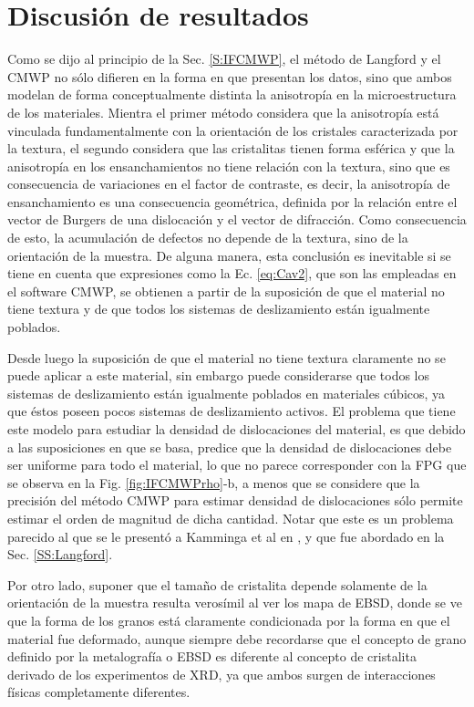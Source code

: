 \section{Discusión de resultados}\label{S:IFDis}
Como se dijo al principio de la Sec. \ref{S:IFCMWP}, el método de Langford y el CMWP no sólo difieren en la forma en que presentan los datos, sino que ambos modelan de forma conceptualmente distinta la anisotropía en la microestructura de los materiales.
Mientra el primer método considera que la anisotropía está vinculada fundamentalmente con la orientación de los cristales caracterizada por la textura, el segundo considera que las cristalitas tienen forma esférica y que la anisotropía en los ensanchamientos no tiene relación con la textura, sino que es consecuencia de variaciones en el factor de contraste, es decir, la anisotropía de ensanchamiento es una consecuencia geométrica, definida por la relación entre el vector de Burgers de una dislocación y el vector de difracción.
Como consecuencia de esto, la acumulación de defectos no depende de la textura, sino de la orientación de la muestra.
De alguna manera, esta conclusión es inevitable si se tiene en cuenta que expresiones como la Ec. \ref{eq:Cav2}, que son las empleadas en el software CMWP, se obtienen a partir de la suposición de que el material no tiene textura y de que todos los sistemas de deslizamiento están igualmente poblados.

Desde luego la suposición de que el material no tiene textura claramente no se puede aplicar a este material, sin embargo puede considerarse que todos los sistemas de deslizamiento están igualmente poblados en materiales cúbicos, ya que éstos poseen pocos sistemas de deslizamiento activos.
El problema que tiene este modelo para estudiar la densidad de dislocaciones del material, es que debido a las suposiciones en que se basa, predice que la densidad de dislocaciones debe ser uniforme para todo el material, lo que no parece corresponder con la FPG que se observa en la Fig. \ref{fig:IFCMWPrho}-b, a menos que se considere que la precisión del método CMWP para estimar densidad de dislocaciones sólo permite estimar el orden de magnitud de dicha cantidad.
Notar que este es un problema parecido al que se le presentó a Kamminga et al en \cite{mittemeijer2003diffraction}, y que fue abordado en la Sec. \ref{SS:Langford}.

Por otro lado, suponer que el tamaño de cristalita depende solamente de la orientación de la muestra resulta verosímil al ver los mapa de EBSD, donde se ve que la forma de los granos está claramente condicionada por la forma en que el material fue deformado, aunque siempre debe recordarse que el concepto de grano definido por la metalografía o EBSD es diferente al concepto de cristalita derivado de los experimentos de XRD, ya que ambos surgen de interacciones físicas completamente diferentes.

